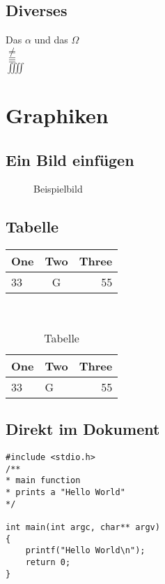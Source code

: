 \documentclass[a4paper, 10pt, fleqn]{article}
\begin{document}
\subsection{Diverses}
Das $\alpha$ und das $\Omega$\\
$\neq$\\
$\equiv$\\
$\iiiint$

\section{Graphiken}
\subsection{Ein Bild einfügen}
\begin{figure}[h!]%
\centering
\caption{Beispielbild}
\label{fig:example}
\end{figure}
\subsection{Tabelle}
\begin{tabular}{l|c|r}
One & Two & Three\\\hline
33 & G & 55\\
\end{tabular}\\
\begin{table}
\begin{tabular}{l|p{6cm}|r}
One & Two & Three\\\hline
33 & G & 55\\
\end{tabular}
\caption{Tabelle}
\label{tab:table1}
\end{table}
\label{Sourcecode}
\subsection{Direkt im Dokument}
\begin{lstlisting}
#include <stdio.h>
/**
* main function
* prints a "Hello World"
*/

int main(int argc, char** argv)
{
	printf("Hello World\n");
	return 0;
}
\end{lstlisting}	
\end{document}
